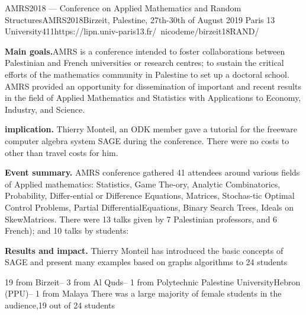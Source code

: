 \begin{event}{AMRS2018 --- Conference on Applied Mathematics and Random Structures}{AMRS2018}{Birzeit, Palestine, 27th-30th of August 2019}
{Paris 13 University}{41}{1}{https://lipn.univ-paris13.fr/~nicodeme/birzeit18RAND/}

\textbf{Main goals.}AMRS is a conference intended to foster collaborations between Palestinian and French universities or research centres; 
to sustain the critical efforts of the mathematics community in Palestine to set up a doctoral school. AMRS provided an opportunity for dissemination of important and recent results in the field of Applied Mathematics and Statistics with Applications to Economy, Industry, and Science.

\textbf{\ODK implication.}
Thierry Monteil, an ODK member gave a tutorial for the freeware computer algebra system SAGE during the conference. 
There were no costs to \ODK other than travel costs for him.

\textbf{Event summary.}
AMRS conference gathered 41 attendees around various fields of Applied mathematics: Statistics, Game The-ory, Analytic Combinatorics, 
Probability, Differ-ential or Difference Equations, Matrices, Stochas-tic Optimal Control Problems, Partial DifferentialEquations, 
Binary Search Trees, Ideals on SkewMatrices. 
There were 13 talks given by 7 Palestinian professors, and 6 French); and 10 talks by students:

\textbf{Results and impact.}
Thierry Monteil has introduced  the  basic  concepts  of  SAGE  and  present  many examples based on graphs algorithms to 24 students

19 from Birzeit–
3 from Al Quds–
1 from Polytechnic Palestine UniversityHebron (PPU)–
1 from Malaya
There was a large majority of female students in the audience,19 out of 24 students

\end{event}
